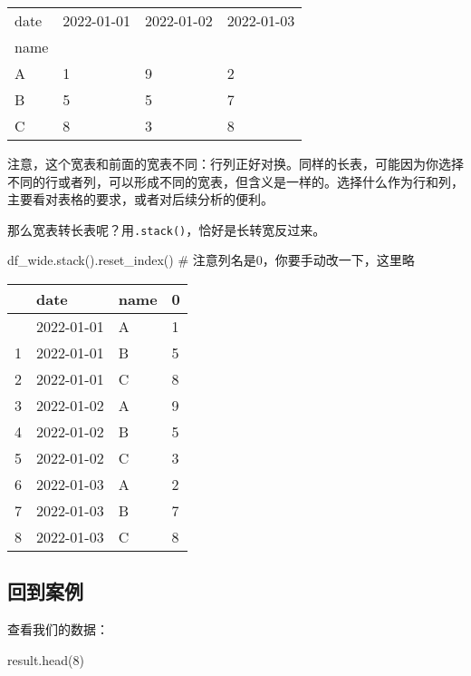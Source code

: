 \documentclass[
  letterpaper,
  DIV=11,
  numbers=noendperiod]{scrreprt}
\newenvironment{Shaded}{\begin{snugshade}}{\end{snugshade}}
\newcommand{\CommentTok}[1]{\textcolor[rgb]{0.37,0.37,0.37}{#1}}
\newcommand{\DecValTok}[1]{\textcolor[rgb]{0.68,0.00,0.00}{#1}}
\newcommand{\NormalTok}[1]{\textcolor[rgb]{0.00,0.23,0.31}{#1}}
\begin{document}
\begin{longtable}[]{@{}llll@{}}
\toprule\noalign{}
date & 2022-01-01 & 2022-01-02 & 2022-01-03 \\
name & & & \\
\midrule\noalign{}
\endhead
\bottomrule\noalign{}
\endlastfoot
A & 1 & 9 & 2 \\
B & 5 & 5 & 7 \\
C & 8 & 3 & 8 \\
\end{longtable}

注意，这个宽表和前面的宽表不同：行列正好对换。同样的长表，可能因为你选择不同的行或者列，可以形成不同的宽表，但含义是一样的。选择什么作为行和列，主要看对表格的要求，或者对后续分析的便利。

那么宽表转长表呢？用\texttt{.stack()}，恰好是长转宽反过来。

\begin{Shaded}
\begin{Highlighting}[]
\NormalTok{df\_wide.stack().reset\_index() }\CommentTok{\# 注意列名是0，你要手动改一下，这里略}
\end{Highlighting}
\end{Shaded}

\begin{longtable}[]{@{}llll@{}}
\toprule\noalign{}
& date & name & 0 \\
\midrule\noalign{}
\endhead
\bottomrule\noalign{}
\endlastfoot
0 & 2022-01-01 & A & 1 \\
1 & 2022-01-01 & B & 5 \\
2 & 2022-01-01 & C & 8 \\
3 & 2022-01-02 & A & 9 \\
4 & 2022-01-02 & B & 5 \\
5 & 2022-01-02 & C & 3 \\
6 & 2022-01-03 & A & 2 \\
7 & 2022-01-03 & B & 7 \\
8 & 2022-01-03 & C & 8 \\
\end{longtable}

\hypertarget{ux56deux5230ux6848ux4f8b}{%
\subsection{回到案例}\label{ux56deux5230ux6848ux4f8b}}

查看我们的数据：

\begin{Shaded}
\begin{Highlighting}[]
\NormalTok{result.head(}\DecValTok{8}\NormalTok{)}
\end{Highlighting}
\end{Shaded}
\end{document}
